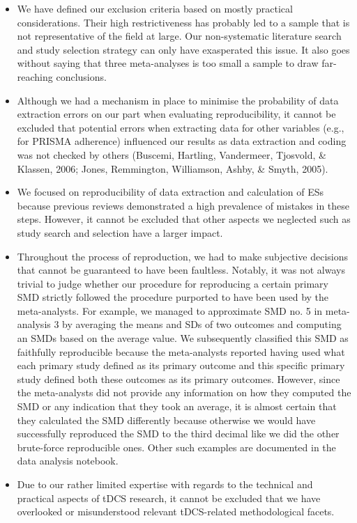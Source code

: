 \documentclass[
  man,floatsintext]{apa6}
\providecommand{\tightlist}{%
  \setlength{\itemsep}{0pt}\setlength{\parskip}{0pt}}
\begin{document}
\begin{itemize}
\tightlist
\item
  We have defined our exclusion criteria based on mostly practical considerations. Their high restrictiveness has probably led to a sample that is not representative of the field at large. Our non-systematic literature search and study selection strategy can only have exasperated this issue. It also goes without saying that three meta-analyses is too small a sample to draw far-reaching conclusions.
\item
  Although we had a mechanism in place to minimise the probability of data extraction errors on our part when evaluating reproducibility, it cannot be excluded that potential errors when extracting data for other variables (e.g., for PRISMA adherence) influenced our results as data extraction and coding was not checked by others (Buscemi, Hartling, Vandermeer, Tjosvold, \& Klassen, 2006; Jones, Remmington, Williamson, Ashby, \& Smyth, 2005).
\item
  We focused on reproducibility of data extraction and calculation of ESs because previous reviews demonstrated a high prevalence of mistakes in these steps. However, it cannot be excluded that other aspects we neglected such as study search and selection have a larger impact.
\item
  Throughout the process of reproduction, we had to make subjective decisions that cannot be guaranteed to have been faultless. Notably, it was not always trivial to judge whether our procedure for reproducing a certain primary SMD strictly followed the procedure purported to have been used by the meta-analysts. For example, we managed to approximate SMD no. 5 in meta-analysis 3 by averaging the means and SDs of two outcomes and computing an SMDs based on the average value. We subsequently classified this SMD as faithfully reproducible because the meta-analysts reported having used what each primary study defined as its primary outcome and this specific primary study defined both these outcomes as its primary outcomes. However, since the meta-analysts did not provide any information on how they computed the SMD or any indication that they took an average, it is almost certain that they calculated the SMD differently because otherwise we would have successfully reproduced the SMD to the third decimal like we did the other brute-force reproducible ones. Other such examples are documented in the data analysis notebook.
\item
  Due to our rather limited expertise with regards to the technical and practical aspects of tDCS research, it cannot be excluded that we have overlooked or misunderstood relevant tDCS-related methodological facets.
\end{itemize}
\end{document}
